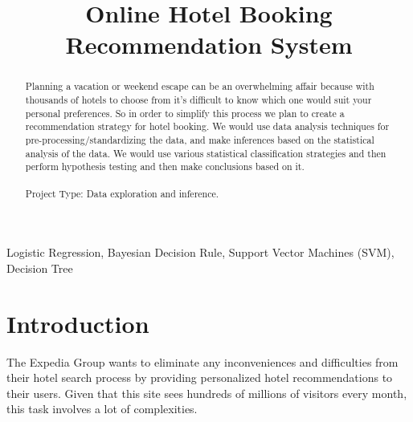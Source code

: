 \documentclass[conference]{IEEEtran}
\begin{document}
\title{\LARGE Online Hotel Booking Recommendation System}


 \author{
}

\maketitle

\begin{abstract}
Planning a vacation or weekend escape can be an overwhelming affair because with thousands of hotels to choose from it’s difficult to know which one would suit your personal preferences. So in order to simplify this process we plan to create a recommendation strategy for hotel booking. We would use data analysis techniques for pre-processing/standardizing the data, and make inferences based on the statistical analysis of the data. We would use various statistical classification strategies and then perform hypothesis testing and then make conclusions based on it.
\\
\\ Project Type: Data exploration and inference.
\\
\end{abstract}

\IEEEoverridecommandlockouts
\begin{keywords}
Logistic Regression, Bayesian Decision Rule, Support Vector Machines (SVM), Decision Tree
\end{keywords}

\IEEEpeerreviewmaketitle



\section{\textbf{Introduction}}
The Expedia Group wants to eliminate any inconveniences and difficulties from their hotel search process by providing personalized hotel recommendations to their users. Given that this site sees hundreds of millions of visitors every month, this task involves a lot of complexities.
\end{document}
